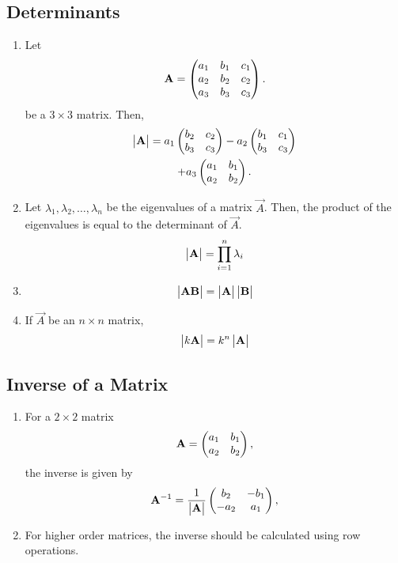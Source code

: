 \documentclass[journal,12pt,twocolumn]{IEEEtran}
\renewcommand\thesection{\arabic{section}}
\renewcommand\thesubsection{\thesection.\arabic{subsection}}
\begin{document}
\subsection{Determinants}
\renewcommand{\theequation}{\theenumi}
\begin{enumerate}[label=\thesubsection.\arabic*.,ref=\thesubsection.\theenumi]

\item Let 
\begin{align}
	\mathbf{A} = \begin{pmatrix} a_1 & b_1 & c_1 \\ a_2 & b_2 & c_2 \\ a_3 & b_3 & c_3\end{pmatrix}.
\end{align}
be a $3 \times 3$ matrix. 
Then, 
\begin{multline}
	\begin{vmatrix}\mathbf{A}\end{vmatrix} = a_1 \begin{pmatrix}  b_2 & c_2 \\  b_3 & c_3\end{pmatrix} - a_2\begin{pmatrix}  b_1 & c_1 \\  b_3 & c_3 \end{pmatrix}  \\ + a_3\begin{pmatrix} a_1 & b_1 \\ a_2 & b_2 \end{pmatrix}.
\end{multline}
\item Let $\lambda_1,\lambda_2, \dots, \lambda_n$ be the eigenvalues of a matrix $\vec{A}$.  Then,   the product of the eigenvalues is equal to the determinant of $\vec{A}$.
\begin{align}
	\begin{vmatrix}\mathbf{A}\end{vmatrix} = \prod_{i=1}^{n}\lambda_i
\end{align}
%
\item 
\begin{align}
	\begin{vmatrix}\mathbf{A}\mathbf{B}\end{vmatrix} = \begin{vmatrix}\mathbf{A}\end{vmatrix}\begin{vmatrix}\mathbf{B}\end{vmatrix}
\end{align}
\item If $\vec{A}$ be an $n \times n$ matrix, 
\begin{align}
	\begin{vmatrix}k\mathbf{A}\end{vmatrix} = k^n\begin{vmatrix}\mathbf{A}\end{vmatrix}
\end{align}

\end{enumerate}
\subsection{Inverse of a Matrix}
\renewcommand{\theequation}{\theenumi}
\begin{enumerate}[label=\thesubsection.\arabic*.,ref=\thesubsection.\theenumi]
\item For a $2 \times 2$ matrix 
\begin{align}
	\mathbf{A} = \begin{pmatrix} a_1 & b_1  \\ a_2 & b_2 \end{pmatrix},
\end{align}
the inverse is given by 
\begin{align}
	\mathbf{A}^{-1} = \frac{1}{\begin{vmatrix}\mathbf{A}\end{vmatrix}}\begin{pmatrix} b_2 & -b_1  \\ -a_2 & a_1 \end{pmatrix},
\end{align}
\item For higher order matrices, the inverse should be calculated using row operations.
\end{enumerate}
\end{document}
